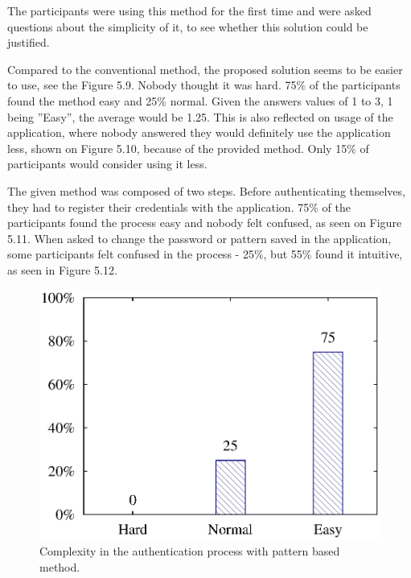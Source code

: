 The participants were using this method for the first time and were asked questions about the simplicity of it, to see whether this solution could be justified. 

Compared to the conventional method, the proposed solution seems to be easier to use, see the Figure 5.9. Nobody thought it was hard. 75\% of the participants found the method easy and 25\% normal. Given the answers values of 1 to 3, 1 being ''Easy'', the average would be 1.25. This is also reflected on usage of the application, where nobody answered they would definitely use the application less, shown on Figure 5.10, because of the provided method. Only 15\% of participants would consider using it less. 

The given method was composed of two steps. Before authenticating themselves, they had to register their credentials with the application. 75\% of the participants found the process easy and nobody felt confused, as seen on Figure 5.11. When asked to change the password or pattern saved in the application, some participants felt confused in the process - 25\%, but 55\% found it intuitive, as seen in Figure 5.12.

\begin{figure}[H]
\centering
\includegraphics[scale=.7]{files/question7/question7.eps}
\caption{Complexity in the authentication process with pattern based method.}
\label{fig:digraph}
\end{figure}

